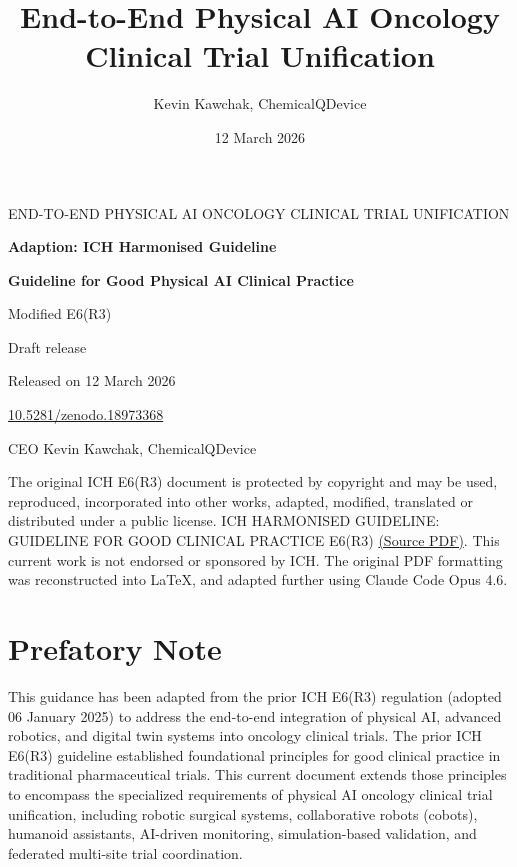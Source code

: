 \documentclass[11pt]{article}
\title{End-to-End Physical AI Oncology Clinical Trial Unification}
\author{Kevin Kawchak, ChemicalQDevice}
\date{12 March 2026}
\begin{document}
\begin{titlepage}
\centering
{\Large END-TO-END PHYSICAL AI ONCOLOGY CLINICAL TRIAL UNIFICATION\par}
\vspace{1.5cm}
{\Huge\bfseries Adaption: ICH Harmonised Guideline\par}
\vspace{0.5cm}
{\LARGE\bfseries Guideline for Good Physical AI Clinical Practice\par}
\vspace{0.3cm}
{\Large Modified E6(R3)\par}
\vspace{0.8cm}
{\large Draft release\par}
\vspace{0.2cm}
{\large Released on 12 March 2026\par}
\vspace{0.2cm}
{\large \href{https://doi.org/10.5281/zenodo.18973368}{10.5281/zenodo.18973368}\par}
\vspace{0.2cm}
{\large CEO Kevin Kawchak, ChemicalQDevice\par}
\vfill
{\small The original ICH E6(R3) document is protected by copyright and may be used, reproduced, incorporated into other works, adapted, modified, translated or distributed under a public license. ICH HARMONISED GUIDELINE: GUIDELINE FOR GOOD CLINICAL PRACTICE E6(R3) \href{https://database.ich.org/sites/default/files/ICH_E6\%28R3\%29_Step4_FinalGuideline_2025_0106.pdf}{(Source PDF)}. This current work is not endorsed or sponsored by ICH. The original PDF formatting was reconstructed into LaTeX, and adapted further using Claude Code Opus 4.6.\par}
\end{titlepage}

\tableofcontents
\clearpage
\section*{Prefatory Note}

This guidance has been adapted from the prior ICH E6(R3) regulation (adopted 06 January 2025) to address the end-to-end integration of physical AI, advanced robotics, and digital twin systems into oncology clinical trials. The prior ICH E6(R3) guideline established foundational principles for good clinical practice in traditional pharmaceutical trials. This current document extends those principles to encompass the specialized requirements of physical AI oncology clinical trial unification, including robotic surgical systems, collaborative robots (cobots), humanoid assistants, AI-driven monitoring, simulation-based validation, and federated multi-site trial coordination.
\end{document}
